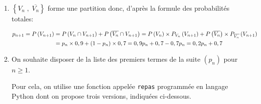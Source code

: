 \begin{enumerate}
\item%
$\left \{ V_n\;,\; \overline{V_n} \right \}$ forme une partition donc, d'après la formule des probabilités totales:

$\aligned
p_{n+1}=P\left(V_{n+1}\right)
&  = P\left(V_n \cap V_{n+1}\right) +P\left (\overline{V_n} \cap V_{n+1}\right)
= P\left(V_n\right) \times P_{V_n}\left(V_{n+1}\right) + P\left(\overline{ V_n} \right) \times P_{\overline{V_n}}\left(V_{n+1}\right)\\
& = p_n\times 0,9+ \left (1-p_n\right )\times 0,7
= 0,9p_n + 0,7 - 0,7p_n = 0,2p_n + 0,7
\endaligned$

\item On souhaite disposer de la liste des premiers termes de la suite $(p_n)$ pour $n \geqslant 1$.

Pour cela, on utilise une fonction appelée \texttt{repas} programmée en langage Python dont on propose trois versions, indiquées ci-dessous.


\end{enumerate}
